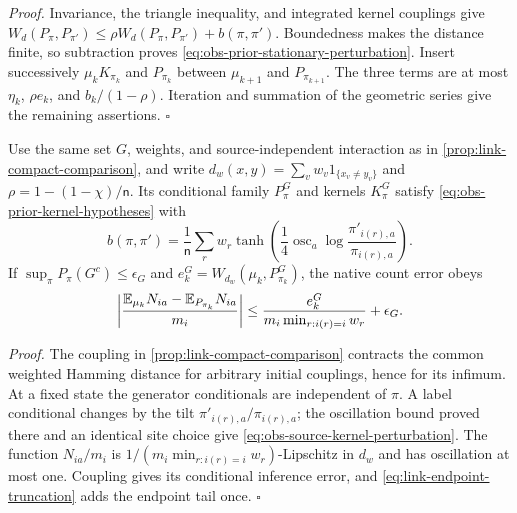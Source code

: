\noindent\emph{Proof.}
Invariance, the triangle inequality, and integrated kernel couplings give
$W_d(P_\pi,P_{\pi'})\le\rho W_d(P_\pi,P_{\pi'})+b(\pi,\pi')$.
Boundedness makes the distance finite, so subtraction proves
\cref{eq:obs-prior-stationary-perturbation}. Insert successively
$\mu_kK_{\pi_k}$ and $P_{\pi_k}$ between $\mu_{k+1}$ and $P_{\pi_{k+1}}$.
The three terms are at most $\eta_k$, $\rho e_k$, and $b_k/(1-\rho)$.
Iteration and summation of the geometric series give the remaining assertions.
$\square$

Use the same set $G$, weights, and source-independent interaction as in
\cref{prop:link-compact-comparison}, and write
$d_w(x,y)=\sum_vw_v1_{\{x_v\ne y_v\}}$ and
$\rho=1-(1-\chi)/\mathsf n$. Its conditional family $P_\pi^G$ and kernels
$K_\pi^G$ satisfy \cref{eq:obs-prior-kernel-hypotheses} with
\begin{equation}
b(\pi,\pi')=\frac1{\mathsf n}\sum_r w_r
\tanh\left(\frac14\operatorname{osc}_a
\log\frac{\pi'_{i(r),a}}{\pi_{i(r),a}}\right).
\label{eq:obs-source-kernel-perturbation}
\end{equation}
If $\sup_\pi P_\pi(G^c)\le\epsilon_G$ and
$e_k^G=W_{d_w}(\mu_k,P_{\pi_k}^G)$, the native count error obeys
\begin{equation}
\left|\frac{\mathbb E_{\mu_k}N_{ia}-\mathbb E_{P_{\pi_k}}N_{ia}}{m_i}\right|
\le\frac{e_k^G}{m_i\min_{r:i(r)=i}w_r}+\epsilon_G.
\label{eq:obs-native-count-tracking}
\end{equation}

\noindent\emph{Proof.}
The coupling in \cref{prop:link-compact-comparison} contracts the common weighted
Hamming distance for arbitrary initial couplings, hence for its infimum.
At a fixed state the generator conditionals are independent of $\pi$.
A label conditional changes by the tilt $\pi'_{i(r),a}/\pi_{i(r),a}$; the
oscillation bound proved there and an identical site choice give
\cref{eq:obs-source-kernel-perturbation}. The function $N_{ia}/m_i$ is
$1/(m_i\min_{r:i(r)=i}w_r)$-Lipschitz in $d_w$ and has oscillation at most one.
Coupling gives its conditional inference error, and
\cref{eq:link-endpoint-truncation} adds the endpoint tail once. $\square$

